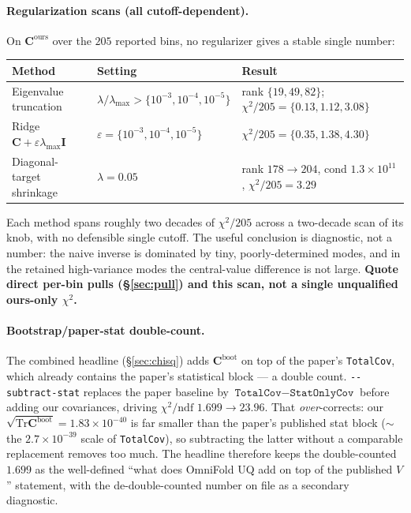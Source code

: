 \documentclass[12pt]{article}
\newcommand{\ours}{\text{ours}}
\newcommand{\boot}{\text{boot}}
\newcommand{\Tr}{\mathrm{Tr}}
\begin{document}
\paragraph{Regularization scans (all cutoff-dependent).}
On $\mathbf{C}^{\ours}$ over the $205$ reported bins, no regularizer
gives a stable single number:
\begin{center}
\begin{tabular}{@{}lll@{}}
\toprule
Method & Setting & Result \\
\midrule
Eigenvalue truncation & $\lambda/\lambda_{\max} > \{10^{-3},10^{-4},10^{-5}\}$ &
  rank $\{19,49,82\}$; $\chi^{2}/205 = \{0.13,1.12,3.08\}$ \\
Ridge $\mathbf{C}+\varepsilon\lambda_{\max}\mathbf{I}$ & $\varepsilon=\{10^{-3},10^{-4},10^{-5}\}$ &
  $\chi^{2}/205 = \{0.35,1.38,4.30\}$ \\
Diagonal-target shrinkage & $\lambda=0.05$ &
  rank $178\to204$, cond $1.3\times10^{11}$, $\chi^{2}/205 = 3.29$ \\
\bottomrule
\end{tabular}
\end{center}
Each method spans roughly two decades of $\chi^{2}/205$ across a
two-decade scan of its knob, with no defensible single cutoff. The
useful conclusion is diagnostic, not a number: the naive inverse is
dominated by tiny, poorly-determined modes, and in the retained
high-variance modes the central-value difference is not large.
\textbf{Quote direct per-bin pulls (\S\ref{sec:pull}) and this scan,
not a single unqualified ours-only $\chi^{2}$.}

\paragraph{Bootstrap/paper-stat double-count.}
The combined headline (\S\ref{sec:chisq}) adds $\mathbf{C}^{\boot}$ on
top of the paper's \texttt{TotalCov}, which already contains the
paper's statistical block --- a double count.
\texttt{-{}-subtract-stat} replaces the paper baseline by
$\texttt{TotalCov}-\texttt{StatOnlyCov}$ before adding our covariances,
driving $\chi^{2}/\mathrm{ndf}$ $1.699\to 23.96$. That \emph{over}-corrects:
our $\sqrt{\Tr\mathbf{C}^{\boot}}=1.83\times10^{-40}$ is far smaller
than the paper's published stat block ($\sim$ the $2.7\times10^{-39}$
scale of \texttt{TotalCov}), so subtracting the latter without a
comparable replacement removes too much. The headline therefore keeps
the double-counted $1.699$ as the well-defined ``what does OmniFold UQ
add on top of the published $V$'' statement, with the de-double-counted
number on file as a secondary diagnostic.
\end{document}
